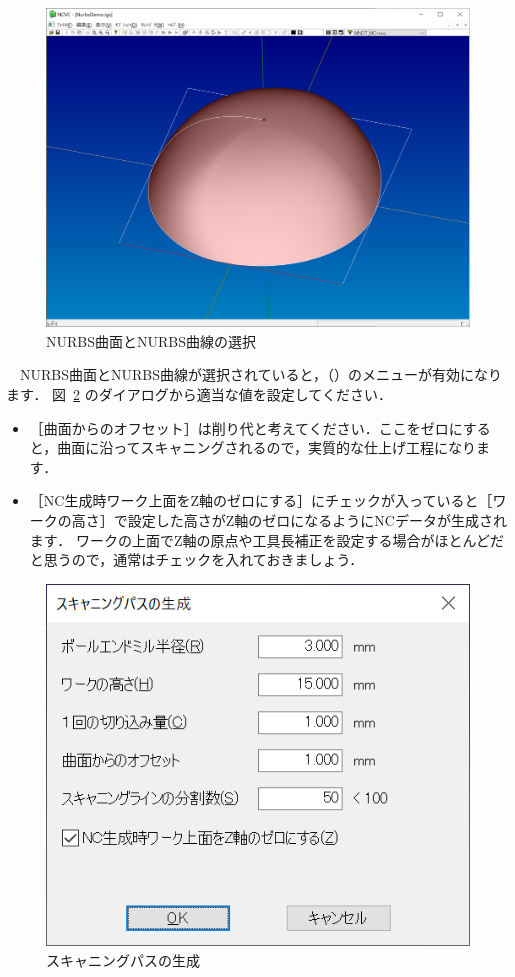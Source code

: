 \begin{figure}[H]
\centering
\includegraphics[scale=0.5]{No2/fig/fig22.png}
\caption{NURBS曲面とNURBS曲線の選択}
\label{fig:ncvc22}
\end{figure}

　NURBS曲面とNURBS曲線が選択されていると，（）のメニューが有効になります．
図~\ref{fig:ncvc23} のダイアログから適当な値を設定してください．

\begin{itemize}
\item ［曲面からのオフセット］は削り代と考えてください．ここをゼロにすると，曲面に沿ってスキャニングされるので，実質的な仕上げ工程になります．
\item ［NC生成時ワーク上面をZ軸のゼロにする］にチェックが入っていると［ワークの高さ］で設定した高さがZ軸のゼロになるようにNCデータが生成されます．
ワークの上面でZ軸の原点や工具長補正を設定する場合がほとんどだと思うので，通常はチェックを入れておきましょう．
\end{itemize}

\begin{figure}[H]
\centering
\includegraphics{No2/fig/fig23.png}
\caption{スキャニングパスの生成}
\label{fig:ncvc23}
\end{figure}

